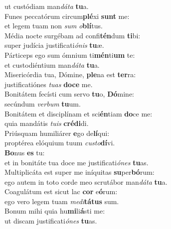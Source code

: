 \evenverse ut custódiam man\textit{dá}\textit{ta} \textbf{tu}a.\\
\oddverse Funes peccatórum circum\textbf{plé}xi \textbf{sunt} me:~\*\\
\oddverse et legem tuam non \textit{sum} \textit{o}\textbf{blí}tus.\\
\evenverse Média nocte surgébam ad confi\textbf{tén}dum \textbf{ti}bi:~\*\\
\evenverse super judícia justificati\textit{ó}\textit{nis} \textbf{tu}æ.\\
\oddverse Párticeps ego sum ómnium ti\textbf{mén}ti\textbf{um} te:~\*\\
\oddverse et custodiéntium man\textit{dá}\textit{ta} \textbf{tu}a.\\
\evenverse Misericórdia tua, Dómine, \textbf{ple}na est \textbf{ter}ra:~\*\\
\evenverse justificatiónes \textit{tu}\textit{as} \textbf{do}\textbf{ce} me.\\
\oddverse Bonitátem fecísti cum servo \textbf{tu}o, \textbf{Dó}mine:~\*\\
\oddverse secúndum \textit{ver}\textit{bum} \textbf{tu}um.\\
\evenverse Bonitátem et disciplínam et sci\textbf{én}tiam \textbf{do}ce me:~\*\\
\evenverse quia mandátis \textit{tu}\textit{is} \textbf{cré}\textbf{di}di.\\
\oddverse Priúsquam humiliárer \textbf{e}go de\textbf{lí}qui:~\*\\
\oddverse proptérea elóquium tuum \textit{cu}\textit{sto}\textbf{dí}vi.\\
\evenverse \textbf{Bo}nus \textbf{es} tu:~\*\\
\evenverse et in bonitáte tua doce me justificati\textit{ó}\textit{nes} \textbf{tu}as.\\
\oddverse Multiplicáta est super me iníquitas \textbf{su}per\textbf{bó}rum:~\*\\
\oddverse ego autem in toto corde meo scrutábor man\textit{dá}\textit{ta} \textbf{tu}a.\\
\evenverse Coagulátum est sicut lac \textbf{cor} e\textbf{ó}rum:~\*\\
\evenverse ego vero legem tuam \textit{me}\textit{di}\textbf{tá}\textbf{tus} sum.\\
\oddverse Bonum mihi quia hu\textbf{mi}li\textbf{á}sti me:~\*\\
\oddverse ut discam justificati\textit{ó}\textit{nes} \textbf{tu}as.\\
